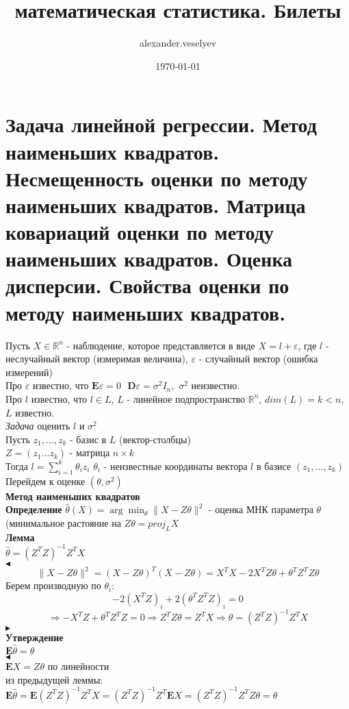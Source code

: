 \documentclass{article}
\title{математическая статистика. Билеты}
\author{alexander.veselyev }
\date{\today}
\begin{document}
\section{Задача линейной регрессии. Метод наименьших квадратов. Несмещенность оценки по методу наименьших квадратов. Матрица ковариаций оценки по методу наименьших квадратов. Оценка дисперсии. Свойства оценки по методу наименьших квадратов.}

Пусть $X\in\mathbb{R}^n$ - наблюдение, которое представляется в виде $X = l + \varepsilon$, где $l$ - неслучайный вектор (измеримая величина), $\varepsilon$ - случайный вектор (ошибка измерений)\\
Про $\varepsilon$ известно, что $\mathbf{E}\varepsilon = 0\ \ \ \mathbf{D}\varepsilon = \sigma^2I_n,$
$\sigma^2$ неизвестно.\\
Про $l$ известно, что $l\in L$, $L$ - линейное подпространство $\mathbb{R}^n$, $dim(L) = k < n$, $L$ известно.\\
\textit{Задача} оценить $l$ и $\sigma^2$\\
Пусть $z_1,\dots,z_k$ - базис в $L$ (вектор-столбцы)\\
$Z = (z_1\dots z_k)$ - матрица $n\times k$\\
Тогда $l = \sum_{i=1}^k{\theta_iz_i}$ $\theta_i$ - неизвестные координаты вектора $l$ в базисе $(z_1,\dots,z_k)$\\
Перейдем к оценке $(\theta,\sigma^2)$\\
\textbf{Метод наименьших квадратов}\\
\textbf{Определение} $\widehat{\theta}(X) = \arg\min_\theta \|X - Z\theta\|^2$ - оценка МНК параметра $\theta$ (минимальное растояние на $Z\theta = proj_LX$\\
\textbf{Лемма}\\
$\widehat{\theta} = (Z^TZ)^{-1}Z^TX$\\
$\blacktriangleleft$
\\
$$ \|X-Z\theta\|^2 = (X-Z\theta)^T(X-Z\theta) = X^TX - 2X^TZ\theta + \theta^TZ^TZ\theta$$
Берем производную по $\theta_i$:
$$ -2(X^TZ)_i + 2(\theta^TZ^TZ)_i = 0 $$
$$ \Rightarrow -X^TZ + \theta^TZ^TZ = 0 \Rightarrow Z^TZ\theta = Z^TX \Rightarrow \theta = (Z^TZ)^{-1}Z^TX $$
$\blacktriangleright$\\
\textbf{Утверждение}\\
$\mathbf{E}\widehat{\theta} = \theta$\\
$\blacktriangleleft$\\
$\mathbf{E}X = Z\theta$ по линейности\\
из предыдущей леммы:\\ $\mathbf{E}\widehat{\theta} = \mathbf{E}(Z^TZ)^{-1}Z^TX = (Z^TZ)^{-1}Z^T\mathbf{E}X = (Z^TZ)^{-1}Z^TZ\theta = \theta$\\
\end{document}
